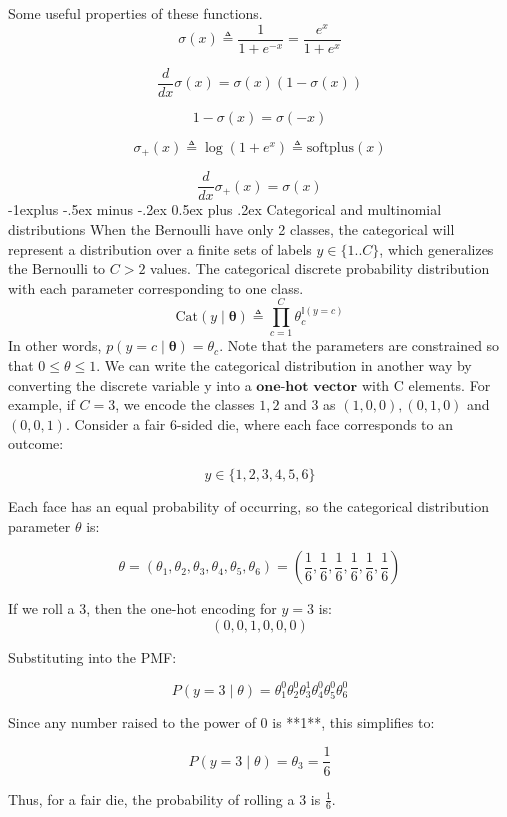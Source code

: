 \documentclass[10pt,landscape]{article}
\makeatletter
\newcommand{\parameter}{\boldsymbol{\theta}}
\renewcommand{\subsection}{\@startsection{subsection}{2}{0mm}%
                                {-1explus -.5ex minus -.2ex}%
                                {0.5ex plus .2ex}%
                                {\normalfont\normalsize\bfseries}}
\makeatother
\begin{document}
\begin{multicols*}{3}
Some useful properties of these functions.
\[
\sigma(x) \triangleq \frac{1}{1 + e^{-x}} = \frac{e^x}{1 + e^x}
\]

\[
\frac{d}{dx} \sigma(x) = \sigma(x)(1 - \sigma(x))
\]

\[
1 - \sigma(x) = \sigma(-x)
\]

\[
\sigma_+(x) \triangleq \log(1 + e^x) \triangleq \text{softplus}(x)
\]

\[
\frac{d}{dx} \sigma_+(x) = \sigma(x)
\]
\subsection{Categorical and multinomial distributions}
When the Bernoulli have only 2 classes, the categorical will represent a distribution over a finite sets of labels $y \in \{1..C\}$, which generalizes the Bernoulli to $C > 2$ values. The categorical discrete probability distribution with each parameter corresponding to one class.
\[
\text{Cat}(y \mid \parameter) \triangleq \prod_{c=1}^{C} \theta_c^{\mathbb{I}(y=c)}
\]
In other words, $p(y=c \mid\parameter)=\theta_c$. Note that the parameters are constrained so that $0\leq\theta\leq1$. We can write the categorical distribution in another way by converting the discrete variable y into a $\textbf{one-hot vector}$ with C elements. For example, if $C=3$, we encode the classes $1,2$ and $3$ as $(1,0,0),(0,1,0)$ and $(0,0,1)$. 
Consider a fair 6-sided die, where each face corresponds to an outcome:

\[
y \in \{1, 2, 3, 4, 5, 6\}
\]

Each face has an equal probability of occurring, so the categorical distribution parameter \( \theta \) is:

\[
\theta = (\theta_1, \theta_2, \theta_3, \theta_4, \theta_5, \theta_6) = \left( \frac{1}{6}, \frac{1}{6}, \frac{1}{6}, \frac{1}{6}, \frac{1}{6}, \frac{1}{6} \right)
\]

If we roll a 3, then the one-hot encoding for \( y = 3 \) is:
\[
(0, 0, 1, 0, 0, 0)
\]

Substituting into the PMF:

\[
P(y = 3 \mid \theta) = \theta_1^0 \theta_2^0 \theta_3^1 \theta_4^0 \theta_5^0 \theta_6^0
\]

Since any number raised to the power of 0 is **1**, this simplifies to:

\[
P(y = 3 \mid \theta) = \theta_3 = \frac{1}{6}
\]

Thus, for a fair die, the probability of rolling a 3 is \( \frac{1}{6} \).


\end{multicols*}
\end{document}
